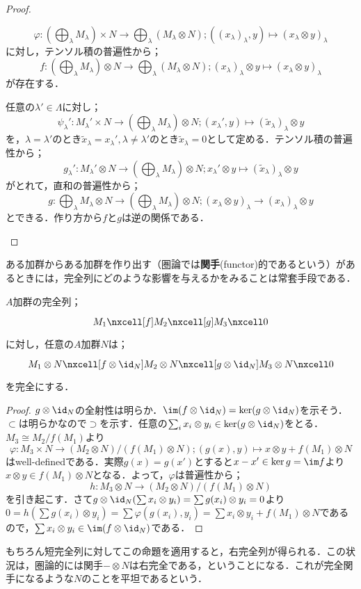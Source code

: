 \begin{proof}
\begin{step}
	\begin{mrkw}
		\item \[\varphi:\left(\bigoplus_\lambda M_\lambda\right)\times N\to\bigoplus_\lambda(M_\lambda\otimes N);((x_\lambda)_\lambda,y)\mapsto(x_\lambda\otimes y)_\lambda\]
		に対し，テンソル積の普遍性から；
		\[f:\left(\bigoplus_\lambda M_\lambda\right)\otimes N\to \bigoplus_\lambda(M_\lambda\otimes N);(x_\lambda)_\lambda\otimes y\mapsto(x_\lambda\otimes y)_\lambda\]
		が存在する．
		\item 任意の$\lambda'\in\Lambda$に対し；
		\[\psi_\lambda':M_\lambda'\times N\to\left(\bigoplus_\lambda M_\lambda\right)\otimes N;(x_\lambda',y)\mapsto(\tilde{x}_\lambda)_\lambda\otimes y\]
		を，$\lambda=\lambda'$のとき$\tilde{x}_\lambda=x_\lambda',\lambda\neq\lambda'$のとき$\tilde{x}_\lambda=0$として定める．テンソル積の普遍性から；
		\[g_\lambda':M_\lambda'\otimes N\to\left(\bigoplus_\lambda M_\lambda\right)\otimes N;x_\lambda'\otimes y\mapsto(\tilde{x}_\lambda)_\lambda\otimes y\]
		がとれて，直和の普遍性から；
		\[g:\bigoplus_\lambda M_\lambda\otimes N\to \left(\bigoplus_\lambda M_\lambda\right)\otimes N;(x_\lambda\otimes y)_\lambda\to(x_\lambda)_\lambda\otimes y\]
		とできる．作り方から$f$と$g$は逆の関係である．
	\end{mrkw}
	\end{step}
\end{proof}

ある加群からある加群を作り出す（圏論では\textbf{関手}(functor)的であるという）があるときには，完全列にどのような影響を与えるかをみることは常套手段である．

\begin{prop}[テンソル積の右完全性]
	$A$加群の完全列；
	\[\begin{tikzcd}
	M_1\nxcell[f]M_2\nxcell[g]M_3\nxcell0
	\end{tikzcd}\]
	に対し，任意の$A$加群$N$は；
	\[\begin{tikzcd}
	M_1\otimes N\nxcell[f\otimes\id_{N}]M_2\otimes N\nxcell[g\otimes\id_{N}]M_3\otimes N\nxcell0
	\end{tikzcd}\]
	を完全にする．
\end{prop}
\begin{proof}
	$g\otimes\id_{N}$の全射性は明らか．$\im(f\otimes\id_{N})=\ker(g\otimes\id_{N})$を示そう．$\subset$は明らかなので$\supset$を示す．任意の$\sum_i x_i\otimes y_i\in\ker(g\otimes\id_{N})$をとる．$M_3\cong M_2/f(M_1)$より
	\[\varphi:M_3\times N\to (M_2\otimes N)/(f(M_1)\otimes N);(g(x),y)\mapsto x\otimes y+f(M_1)\otimes N\]
	はwell-definedである．実際$g(x)=g(x')$とすると$x-x'\in\ker g=\im f$より$x\otimes y\in f(M_1)\otimes N$となる．よって，$\varphi$は普遍性から；
	\[h:M_3\otimes N\to(M_2\otimes N)/(f(M_1)\otimes N)\]
	を引き起こす．さて$g\otimes\id_{N}(\sum x_i\otimes y_i)=\sum g(x_i)\otimes y_i=0$より$0=h(\sum g(x_i)\otimes y_i)=\sum \varphi(g(x_i),y_i)=\sum x_i\otimes y_i+f(M_1)\otimes N$であるので，$\sum x_i\otimes y_i\in\im(f\otimes\id_{N})$である．
\end{proof}
もちろん短完全列に対してこの命題を適用すると，右完全列が得られる．この状況は，圏論的には関手$-\otimes N$は右完全である，ということになる．これが完全関手になるような$N$のことを平坦であるという．

